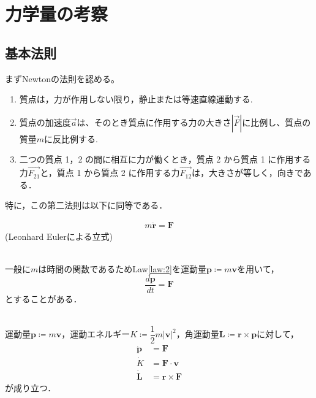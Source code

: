 \documentclass[dvipdfmx,uplatex]{jsarticle}
\begin{document}
\section{力学量の考察}

\subsection{基本法則}
まずNewtonの法則を認める。
\begin{law}\mbox{}
\begin{enumerate}
\item 質点は，力が作用しない限り，静止または等速直線運動する.
\item 質点の加速度$\overrightarrow{a}$は、そのとき質点に作用する力の大きさ$\left|{\overrightarrow{F}}\right|$に比例し、質点の質量$m$に反比例する.
\item 二つの質点 1，2 の間に相互に力が働くとき，質点 2 から質点 1 に作用する力$\overrightarrow{F_{21}}$と，質点 1 から質点 2 に作用する力$\overrightarrow{F_{12}}$は，大きさが等しく，向きである．
\end{enumerate}
\end{law}
特に，この第二法則は以下に同等である．
\begin{law}[第2法則の言い換え]\label{law:2}

\begin{align}
m \ddot{\bm{r}} = \bm{F} \label{equation-of-motion}
\end{align}
(Leonhard Eulerによる立式)
\end{law}

\begin{cf}\label{cf:1.3}\mbox{}\\
  一般に$m$は時間の関数であるため\rm{Law}\ref{law:2}を運動量$\bm{p} \coloneqq m \bm{v}$を用いて，
  \begin{equation*}
    \frac{d\bm{p}}{dt} = \bm{F}
  \end{equation*}
  とすることがある．
\end{cf}

\begin{theo}\mbox{}\\
  運動量$\bm{p} \coloneqq m \bm{v}$，運動エネルギー$K \coloneqq \dfrac{1}{2} m |\bm{v}|^2$，角運動量$\bm{L} \coloneqq \bm{r} \times \bm{p}$に対して，
  \begin{align}
    \bm{\dot{p}} &= \bm{F} \label{eq:1.2}\\
    \dot{K} &= \bm{F} \cdot \bm{v} \label{eq:1.3} \\
    \bm{\dot{L}} &= \bm{r} \times \bm{F} \label{eq:1.4}
  \end{align}
  が成り立つ．
\end{theo}
\end{document}
